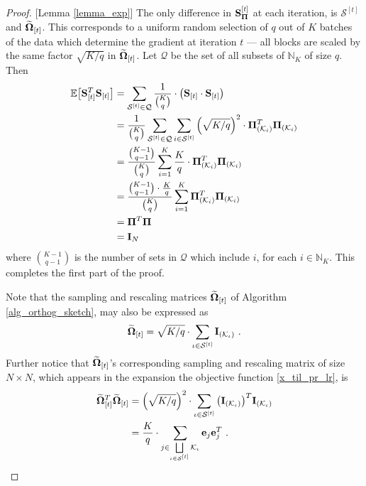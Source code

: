 \documentclass[journal,letterpaper,onecolumn,twoside,nofonttune]{IEEEtran}
\newcommand{\K}{\mathcal{K}}
\newcommand{\Qcal}{\mathcal{Q}}
\newcommand{\Pibold}{\bold{\Pi}}
\newcommand{\Omb}{\bold{\Omega}}
\newcommand{\Ombwt}{\widetilde{\Omb}}
\newcommand{\Scal}{\mathcal{S}}
\newcommand{\E}{\mathbb{E}}
\newcommand{\N}{\mathbb{N}}
\newcommand{\Sb}{\bold{S}}
\newcommand{\SbPi}{\Sb_{\Pibold}}
\newcommand{\eb}{\bold{e}}
\newcommand{\Ib}{\bold{I}}
\begin{document}
\begin{proof}{[Lemma \ref{lemma_exp}]}
The only difference in $\SbPi^{[t]}$ at each iteration, is $\Scal^{[t]}$ and $\Ombwt_{[t]}$. This corresponds to a uniform random selection of $q$ out of $K$ batches of the data which determine the gradient at iteration $t$ --- all blocks are scaled by the same factor $\sqrt{K/q}$ in $\Ombwt_{[t]}$. Let $\Qcal$ be the set of all subsets of $\N_K$ of size $q$. Then
\begin{align*}
  \E\big[\Sb_{[t]}^T\Sb_{[t]}\big] &= \sum_{\Scal^{[t]}\in\Qcal}\frac{1}{{K\choose q}}\cdot\left(\Sb_{[t]}\cdot\Sb_{[t]}\right)\\
  &= \frac{1}{{K\choose q}}\sum_{\Scal^{[t]}\in\Qcal}\sum_{i\in\Scal^{[t]}}{\left(\sqrt{K/q}\right)^2}\cdot\Pibold_{(\K_i)}^T\Pibold_{(\K_i)}\\
  &= \frac{{K-1\choose q-1}}{{K\choose q}}\sum_{i=1}^K\frac{K}{q}\cdot\Pibold_{(\K_i)}^T\Pibold_{(\K_i)}\\
  &= \frac{{K-1\choose q-1}\cdot\frac{K}{q}}{{K\choose q}}\sum_{i=1}^K\Pibold_{(\K_i)}^T\Pibold_{(\K_i)}\\
  &= \Pibold^T\Pibold\\
  &= \Ib_N
\end{align*}
where ${K-1\choose q-1}$ is the number of sets in $\Qcal$ which include $i$, for each $i\in\N_K$. This completes the first part of the proof.

Note that the sampling and rescaling matrices $\Ombwt_{[t]}$ of Algorithm \ref{alg_orthog_sketch}, may also be expressed as
$$ \Ombwt_{[t]} = \sqrt{K/q}\cdot \sum_{\iota\in\Scal^{[t]}}\Ib_{(\K_\iota)} \ . $$
Further notice that $\Ombwt_{[t]}$'s corresponding sampling and rescaling matrix of size $N\times N$, which appears in the expansion the objective function \eqref{x_til_pr_lr}, is
\begin{align*}
  \Ombwt_{[t]}^T\Ombwt_{[t]} &= \left(\sqrt{K/q}\right)^2\cdot\sum_{\iota\in\Scal^{[t]}}\big(\Ib_{(\K_\iota)}\big)^T\Ib_{(\K_\iota)}\\
  &= \frac{K}{q}\cdot\sum_{j\in\bigsqcup\limits_{\iota\in\Scal^{[t]}}\K_\iota} \eb_{j}\eb_j^{T}\ .
\end{align*}


\end{proof}
\end{document}
